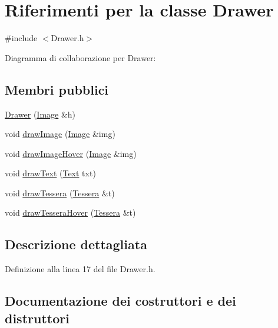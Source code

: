 \hypertarget{class_drawer}{}\section{Riferimenti per la classe Drawer}
\label{class_drawer}


{\ttfamily \#include $<$Drawer.\+h$>$}



Diagramma di collaborazione per Drawer\+:
\subsection*{Membri pubblici}
\begin{DoxyCompactItemize}
\item 
\hyperlink{class_drawer_a45cc37453cb3ff67e74a770447983803}{Drawer} (\hyperlink{class_image}{Image} \&h)
\item 
void \hyperlink{class_drawer_adeaa9f61868ca65d08ba253ac46e681d}{draw\+Image} (\hyperlink{class_image}{Image} \&img)
\item 
void \hyperlink{class_drawer_a83003fc88078355f22d868a29954da7d}{draw\+Image\+Hover} (\hyperlink{class_image}{Image} \&img)
\item 
void \hyperlink{class_drawer_a203eca4b4a5c98c73678303bf9e5a23e}{draw\+Text} (\hyperlink{class_text}{Text} txt)
\item 
void \hyperlink{class_drawer_a67cd9032cb173644a483a602b1744bdb}{draw\+Tessera} (\hyperlink{class_tessera}{Tessera} \&t)
\item 
void \hyperlink{class_drawer_a636c4671688d289dbbf50f20f7e20b12}{draw\+Tessera\+Hover} (\hyperlink{class_tessera}{Tessera} \&t)
\end{DoxyCompactItemize}


\subsection{Descrizione dettagliata}


Definizione alla linea 17 del file Drawer.\+h.



\subsection{Documentazione dei costruttori e dei distruttori}
\mbox{\label{class_drawer_a45cc37453cb3ff67e74a770447983803}} 
